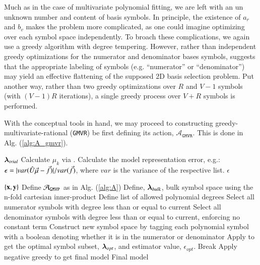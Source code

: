 \documentclass[twocolumn,aps,prd,floatfix,preprintnumbers,a4paper,nofootinbib,
superscriptaddress,10pt]{revtex4-1}
\def\gmvp#1{greedy-multivariate-polynomial#1
  (\texttt{GMVP}#1)\gdef\gmvp{\texttt{GMVP}}}
\def\gmvr#1{greedy-multivariate-rational#1
  (\texttt{GMVR}#1)\gdef\gmvr{\texttt{GMVR}}}
\begin{document}
%
\par Much as in the case of multivariate polynomial fitting, we are left with an un unknown number and content of basis symbols.
%
In principle, the existence of $a_r$ and $b_v$ makes the problem more complicated, as one could imagine optimizing over each symbol space independently.
%
To broach these complications, we again use a greedy algorithm with degree tempering.
%
However, rather than independent greedy optimizations for the numerator and denominator bases symbols,  suggests that the appropriate labeling of symbols (e.g. ``numerator'' or ``denominator'') may yield an effective flattening of the supposed 2D basis selection problem.
%
Put another way, rather than two greedy optimizations over $R$ and $V-1$ symbols (with $(V-1)R$ iterations), a single greedy process over $V+R$ symbols is performed.
%
\par With the conceptual tools in hand, we may proceed to constructing \gmvr{} be first defining its action, $\mathcal{A}_{\gmvr}$.
%
This is done in Alg. (\ref{alg:A_gmvr}).
%
\hspace{1cm}
{\scriptsize
\begin{algorithm}[H]
  \caption{$\mathcal{A}_{\gmvr}$, the action for \gmvr. Model calculation given basis symbols, and output of model error estimate.}
  \label{alg:A_gmvr}
  \begin{algorithmic}[1]
     ${\bm{\lambda}}_{trial}$
    \vskip 10pt
    \State Calculate $\mu_k$ via .
    \State Calculate the model representation error, e.g.: $\epsilon = |var(\hat{U} \vec{\mu} - \vec{f})|/var(\vec{f})$, where $var$ is the variance of the respective list.
    \vskip 10pt
     $\epsilon$
  \end{algorithmic}
\end{algorithm}
}
%
\hspace{1cm}
{\scriptsize
\begin{algorithm}[H]
  \caption{\gmvr{}, a degree tempered stepwise algorithm for multivariate rational modeling of scalar data.}
  \label{alg:gmvr}
  \begin{algorithmic}[1]
     $ \{ \bf{x}, \bf{y} \}$
    \vskip 10pt
    \State Define $\mathcal{A}_{\gmvp}$ as in Alg. (\ref{alg:A})
    \State Define, ${\bm{\lambda}}_{bulk}$, bulk symbol space using the n-fold cartesian inner-product
    \State Define list of allowed polynomial degrees
      \State Select all numerator symbols with degree less than or equal to current
      \State Select all denominator symbols with degree less than or equal to current, enforcing no constant term
      \State Construct new symbol space by tagging each polynomial symbol with a boolean denoting whether it is in the numerator or denominator
      \State Apply \pgreedy{} to get the optimal symbol subset, ${\bm{\lambda}}_{opt}$, and estimator value, $\epsilon_{opt}$.
        \State Break
      \EndIf
    \EndFor
    \State Apply negative greedy to get final model
    \vskip 10pt
     Final model
  \end{algorithmic}
\end{algorithm}
}
\end{document}
